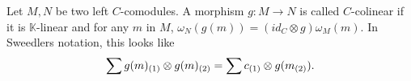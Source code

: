 \documentclass[../thesis.tex]{subfiles}
\begin{document}
\begin{definition}[Comodules]
        
        
        
        
        
        
                            
        
                \end{definition}

                \begin{definition}
                    Let $M, N$ be two left $C$-comodules. A morphism $g:M\rightarrow N$ is called $C$-colinear if it is $\mathbb{K}$-linear and for any $m$ in $M$, $\omega_N(g(m)) = (id_C\otimes g)\omega_M(m)$. In Sweedlers notation, this looks like
                    \begin{align*}
                        \sum g(m)_{(1)}\otimes g(m)_{(2)} = \sum c_{(1)}\otimes g(m_{(2)})\tt{.}
                    \end{align*}
                \end{definition}
\end{document}
